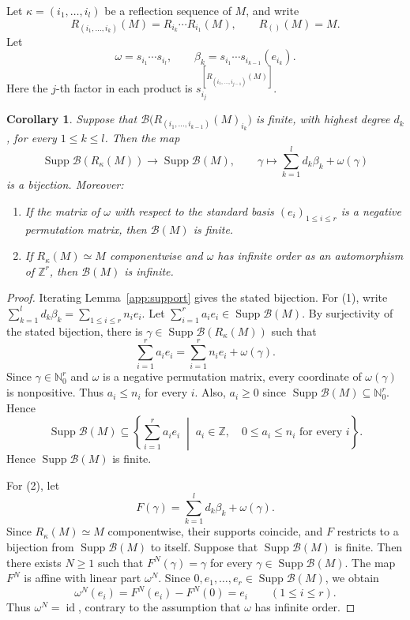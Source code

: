 \documentclass[11pt, a4paper]{article}
\numberwithin{equation}{section}
\newcommand{\B}{\mathcal B}
\DeclareMathOperator{\id}{id}
\newtheorem{corollary}[theorem]{Corollary}
\begin{document}
Let $\kappa=(i_1,\ldots,i_l)$ be a reflection sequence of $M$, and write
\[
 R_{(i_1,\ldots,i_k)}(M)=R_{i_k}\cdots R_{i_1}(M),
 \qquad R_{()}(M)=M.
\]
 Let
\[
 \omega= {s_{i_1}\cdots s_{i_l}},
 \qquad
 \beta_k= {s_{i_1}\cdots
 s_{i_{k-1}}({e}_{i_k})}.
\]
Here the $j$-th factor in each product is
$s_{i_j}^{[R_{(i_1,\ldots,i_{j-1})}(M)]}$.
\begin{corollary}\label{app:support-criterion}
Suppose that
$\B\bigl(R_{(i_1,\ldots,i_{k-1})}(M)_{i_k}\bigr)$ is finite,
with highest degree $d_k$, for every $1\le k\le l$. Then the map
\[
 {\operatorname{Supp}\B(R_\kappa(M))}\longrightarrow {\operatorname{Supp}\B(M)},\qquad
 \gamma\longmapsto
 \sum_{k=1}^l d_k\beta_k+\omega(\gamma)
\]
is a bijection. Moreover:
\begin{enumerate}
\item If the matrix of $\omega$ with respect to the standard
basis $(e_i)_{1\leq i \leq r}$ is a negative permutation
matrix, then $\B(M)$ is finite.
\item If $R_\kappa(M)\simeq M$ componentwise and $\omega$
has infinite order as an automorphism of $\mathbb Z^{r}$,
then $\B(M)$ is infinite.
\end{enumerate}
\end{corollary}

\begin{proof}
Iterating Lemma~\ref{app:support} gives the stated bijection.
For \textup{(1)}, write
$\sum_{k=1}^l d_k\beta_k=\sum_{1\leq i \leq r}n_ie_i$.
{Let
$\sum_{i=1}^r a_ie_i\in\operatorname{Supp}\B(M)$.
By surjectivity of the stated bijection, there is
$\gamma\in\operatorname{Supp}\B(R_\kappa(M))$ such that}
\[
 {
 \sum_{i=1}^r a_ie_i
 =\sum_{i=1}^r n_ie_i+\omega(\gamma).
 }
\]
{Since $\gamma\in\mathbb N_0^r$ and $\omega$
is a negative permutation matrix, every coordinate of
$\omega(\gamma)$ is nonpositive. Thus $a_i\le n_i$ for every $i$.
Also, $a_i\ge0$ since
$\operatorname{Supp}\B(M)\subseteq\mathbb N_0^r$. Hence}
\[
 {
 \operatorname{Supp}\B(M)\subseteq
 \left\{
 \sum_{i=1}^r a_ie_i
 \;\middle|\;
 a_i\in\mathbb Z,\quad 0\le a_i\le n_i
 \text{ for every }i
 \right\}.
 }
\]
Hence ${\operatorname{Supp}\B(M)}$ is finite.

For \textup{(2)}, let
\[
 F(\gamma)=\sum_{k=1}^l d_k\beta_k+\omega(\gamma).
\]
Since $R_\kappa(M)\simeq M$ componentwise, their supports
coincide, and $F$ restricts to a bijection from ${\operatorname{Supp}\B(M)}$ to itself.
Suppose that ${\operatorname{Supp}\B(M)}$ is finite. Then there exists $N\ge1$ such
that $F^N(\gamma)=\gamma$ for every $\gamma\in {\operatorname{Supp}\B(M)}$.
The map $F^N$ is affine with linear part $\omega^N$.
Since $0,{e}_1,\ldots,{e}_r\in {\operatorname{Supp}\B(M)}$, we obtain
\[
 \omega^N({e}_i)
 =F^N({e}_i)-F^N(0)
 ={e}_i
 \qquad(1\le i\le r).
\]
Thus $\omega^N=\id$, contrary to the assumption that
$\omega$ has infinite order.
\end{proof}
\end{document}
